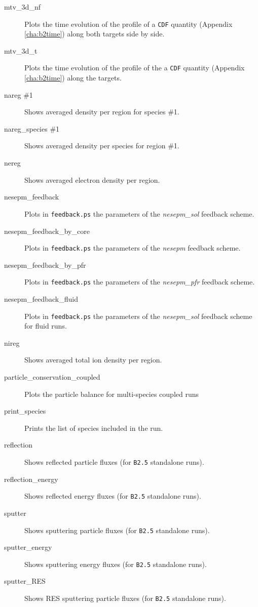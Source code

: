\documentclass[a4paper,10pt]{report}
\begin{document}
\begin{itemize}
\begin{description}
  \item[mtv\_3d\_nf] Plots the time evolution of the profile of a {\tt CDF} quantity (Appendix \ref{cha:b2time}) along both targets side by side.
  \item[mtv\_3d\_t] Plots the time evolution of the profile of the a {\tt CDF} quantity (Appendix \ref{cha:b2time}) along the targets.
  \item[nareg \#1] Shows averaged density per region for species \#1.
  \item[nareg\_species \#1] Shows averaged density per species for region \#1.
  \item[nereg] Shows averaged electron density per region.
  \item[nesepm\_feedback] Plots in {\tt feedback.ps} the parameters of the {\em nesepm\_sol} feedback scheme.
  \item[nesepm\_feedback\_by\_core] Plots in {\tt feedback.ps} the parameters of the {\em nesepm} feedback scheme.
  \item[nesepm\_feedback\_by\_pfr] Plots in {\tt feedback.ps} the parameters of the {\em nesepm\_pfr} feedback scheme.
  \item[nesepm\_feedback\_fluid] Plots in {\tt feedback.ps} the parameters of the {\em nesepm\_sol} feedback scheme for fluid runs.
  \item[nireg] Shows averaged total ion density per region.
  \item[particle\_conservation\_coupled] Plots the particle balance for multi-species coupled runs
  \item[print\_species] Prints the list of species included in the run.
  \item[reflection] Shows reflected particle fluxes (for {\tt B2.5} standalone runs).
  \item[reflection\_energy] Shows reflected energy fluxes (for {\tt B2.5} standalone runs).
  \item[sputter] Shows sputtering particle fluxes (for {\tt B2.5} standalone runs).
  \item[sputter\_energy] Shows sputtering energy fluxes (for {\tt B2.5} standalone runs).
  \item[sputter\_RES] Shows RES sputtering particle fluxes (for {\tt B2.5} standalone runs).

\end{description}
\end{itemize}
\end{document}
